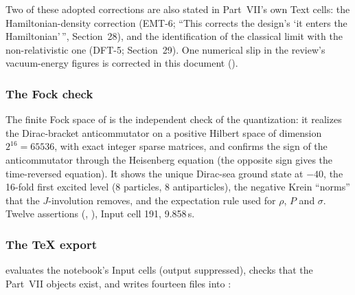 Two of these adopted corrections are also stated in Part~VII's own Text cells: the
Hamiltonian-density correction (EMT-6; ``This corrects the design's `it enters the Hamiltonian'\,'',
Section~28), and the identification of the classical limit with the non-relativistic one (DFT-5;
Section~29). One numerical slip in the review's vacuum-energy figures is corrected in this document
().

\subsubsection{The Fock check}
\label{sec:3.9.5}

The finite Fock space of  is the independent check of the quantization: it realizes
the Dirac-bracket anticommutator on a positive Hilbert space of dimension $2^{16}=65536$, with exact
integer sparse matrices, and confirms the sign of the anticommutator through the Heisenberg equation
(the opposite sign gives the time-reversed equation). It shows the unique Dirac-sea ground state at
$-40$, the 16-fold first excited level (8 particles, 8 antiparticles), the negative Krein ``norms''
that the $J$-involution removes, and the expectation rule used for $\rho$, $P$ and $\sigma$. Twelve
assertions (, ), Input cell 191, 9.858\,s.

\subsubsection{The TeX export}
\label{sec:3.9.6}

 evaluates the notebook's Input cells (output
suppressed), checks that the Part~VII objects exist, and writes fourteen files into
:

